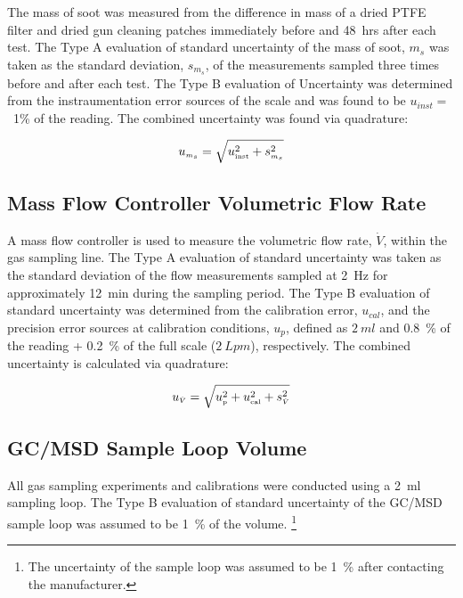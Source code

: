 \documentclass[12pt]{article}
\begin{document}
The mass of soot was measured from the difference in mass of a dried PTFE filter and dried gun cleaning patches immediately before and 48~\si{hrs} after each test. The Type A evaluation of standard uncertainty of the mass of soot, $m_{s}$ was taken as the standard deviation, $s_{m_{s}}$, of the measurements sampled three times before and after each test. The Type B evaluation of Uncertainty was determined from the instraumentation error sources of the scale and was found to be $u_{inst}=$~1\% of the reading. The combined uncertainty was found via quadrature:

\begin{equation}
\label{eq:soot_mass_uncertainty}
u_{\scriptscriptstyle m_{s}} = \sqrt{u_{\rm \scriptscriptstyle inst}^2 + s_{\scriptscriptstyle m_{s}}^2}
\end{equation}

\subsection{Mass Flow Controller Volumetric Flow Rate}
\label{ssec:Mass_Flow_Controller_Volumetric_Flow_Rate}

A mass flow controller is used to measure the volumetric flow rate, $\dot{V}$, within the gas sampling line. The Type A evaluation of standard uncertainty was taken as the standard deviation of the flow measurements sampled at 2~\si{Hz} for approximately 12~\si{min} during the sampling period. The Type B evaluation of standard uncertainty was determined from the calibration error, $u_{cal}$, and the precision error sources at calibration conditions, $u_{p}$, defined as $2~\si{ml}$ and 0.8~\% of the reading + 0.2~\% of the full scale ($2~\si{Lpm}$), respectively. The combined uncertainty is calculated via quadrature:

\begin{equation}
\label{eq:volumetric_flow_uncertainty}
u_{\scriptscriptstyle \dot{V}} = \sqrt{u_{\rm \scriptscriptstyle p}^2 + u_{\rm \scriptscriptstyle cal}^2 + s_{\scriptscriptstyle \dot{V}}^2}
\end{equation}

\subsection{GC/MSD Sample Loop Volume}
\label{ssec:Sample_Loop_Volume}

All gas sampling experiments and calibrations were conducted using a 2~\si{ml} sampling loop. The Type B evaluation of standard uncertainty of the GC/MSD sample loop was assumed to be 1~\% of the volume. \footnote{The uncertainty of the sample loop was assumed to be 1~\% after contacting the manufacturer.}
\end{document}
